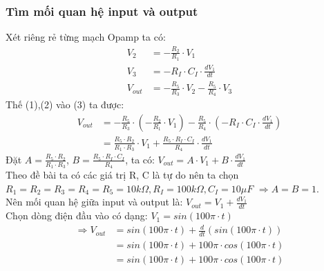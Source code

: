         \subsubsection{Tìm mối quan hệ input và output}
            \hspace*{0.6cm}Xét riêng rẻ từng mạch Opamp ta có: 
            \begin{align}
                V_{2} &= -\frac{R_2}{R_1} \cdot V_{1} \tag{1} \\
                V_{3} &= -R_{I} \cdot C_{I} \cdot \frac{dV_{1}}{dt} \tag{2} \\
                V_{out} &= -\frac{R_{5}}{R_3} \cdot V_{2} - \frac{R_{5}}{R_4} \cdot V_{3} \tag{3}
            \end{align}
            \hspace*{0.6cm}Thế (1),(2) vào (3) ta được:
            \begin{align*}
                V_{out} &= -\frac{R_{5}}{R_3} \cdot \left(-\frac{R_2}{R_1} \cdot V_{1}\right) - \frac{R_{5}}{R_4} \cdot \left(-R_{I} \cdot C_{I} \cdot \frac{dV_{1}}{dt}\right) \\
                        &= \frac{R_{5} \cdot R_2}{R_1 \cdot R_3} \cdot V_{1} + \frac{R_{5} \cdot R_{I} \cdot C_{I}}{R_4} \cdot \frac{dV_{1}}{dt}
            \end{align*}
            \hspace*{0.6cm}Đặt $A=\frac{R_{5} \cdot R_2}{R_1 \cdot R_3}$, $B=\frac{R_{5} \cdot R_{I} \cdot C_{I}}{R_4}$, ta có: $V_{out} = A \cdot V_{1} + B \cdot \frac{dV_{1}}{dt}$ \\
            \hspace*{0.6cm}Theo đề bài ta có các giá trị R, C là tự do nên ta chọn $R_{1} = R_{2} = R_{3} = R_{4} = R_{5} = 10k\Omega, R_{I} = 100k\Omega, C_{I} = 10\mu F$ $\Rightarrow A = B = 1$. \\
            \hspace*{0.6cm}Nên mối quan hệ giữa input và output là: $V_{out} = V_{1} + \frac{dV_{1}}{dt}$ \\
            \hspace*{0.6cm}Chọn dòng điện đầu vào có dạng: $V_{1} = sin(100\pi \cdot t)$ 
            \begin{align*}
                \Rightarrow V_{out} &= sin(100\pi \cdot t) + \frac{d}{dt} \left(sin(100\pi \cdot t)\right) \\
                                    &= sin(100\pi \cdot t) + 100\pi \cdot cos(100\pi \cdot t) \\
                                    &= sin(100\pi \cdot t) + 100\pi \cdot cos(100\pi \cdot t)
            \end{align*}
